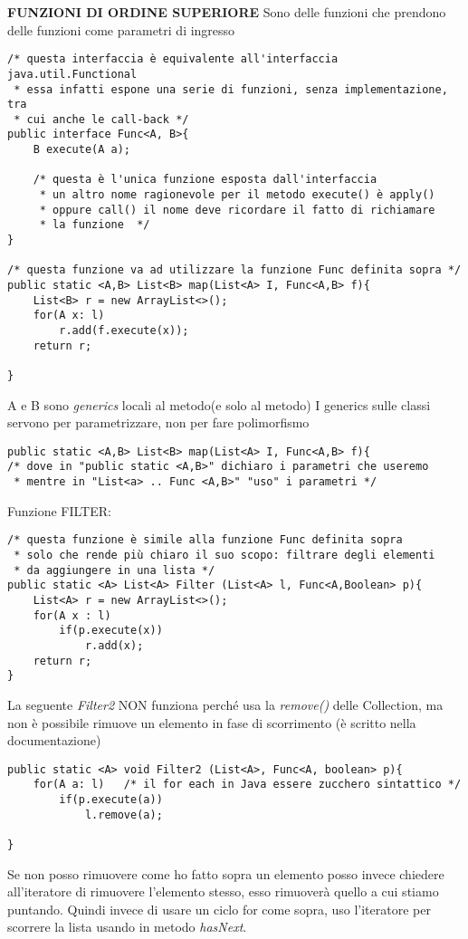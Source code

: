 \noindent \textbf{FUNZIONI DI ORDINE SUPERIORE} \newline
Sono delle funzioni che prendono delle funzioni come parametri di ingresso 
\begin{lstlisting}[basicstyle=\small,]
/* questa interfaccia è equivalente all'interfaccia java.util.Functional
 * essa infatti espone una serie di funzioni, senza implementazione, tra 
 * cui anche le call-back */
public interface Func<A, B>{
	B execute(A a); 
	
	/* questa è l'unica funzione esposta dall'interfaccia
	 * un altro nome ragionevole per il metodo execute() è apply() 
	 * oppure call() il nome deve ricordare il fatto di richiamare 
	 * la funzione  */
}

/* questa funzione va ad utilizzare la funzione Func definita sopra */
public static <A,B> List<B> map(List<A> I, Func<A,B> f){
	List<B> r = new ArrayList<>();
	for(A x: l)
		r.add(f.execute(x));
	return r;

}
\end{lstlisting}
A e B sono \textit{generics} locali al metodo(e solo al metodo) \newline
I generics sulle classi servono per parametrizzare, non per fare polimorfismo \newline
\begin{lstlisting}[basicstyle=\small,]
public static <A,B> List<B> map(List<A> I, Func<A,B> f){
/* dove in "public static <A,B>" dichiaro i parametri che useremo
 * mentre in "List<a> .. Func <A,B>" "uso" i parametri */
\end{lstlisting}

\noindent Funzione FILTER: 
\begin{lstlisting}[basicstyle=\small,]
/* questa funzione è simile alla funzione Func definita sopra
 * solo che rende più chiaro il suo scopo: filtrare degli elementi
 * da aggiungere in una lista */
public static <A> List<A> Filter (List<A> l, Func<A,Boolean> p){
	List<A> r = new ArrayList<>();
	for(A x : l)
		if(p.execute(x))
			r.add(x);
	return r;
}
\end{lstlisting}

\noindent La seguente \textit{Filter2} NON funziona perché usa la \textit{remove()} delle Collection, ma non è possibile rimuove un elemento in fase di scorrimento (è scritto nella documentazione)

\begin{lstlisting}[basicstyle=\small,]
public static <A> void Filter2 (List<A>, Func<A, boolean> p){
	for(A a: l)   /* il for each in Java essere zucchero sintattico */
		if(p.execute(a))
			l.remove(a);

}
\end{lstlisting}
Se non posso rimuovere come ho fatto sopra un elemento posso invece chiedere all'iteratore di rimuovere l'elemento stesso, esso rimuoverà quello a cui stiamo puntando. Quindi invece di usare un ciclo for come sopra, uso l'iteratore per scorrere la lista usando in metodo \textit{hasNext}.

